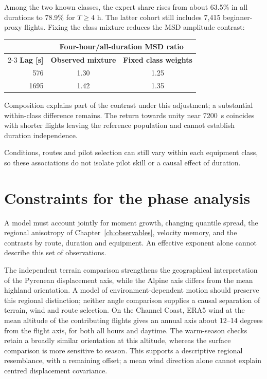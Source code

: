 Among the two known classes, the expert share rises from about 63.5\% in all
durations to 78.9\% for $T\ge4$ h. The latter cohort still includes 7,415
beginner-proxy flights. Fixing the class mixture reduces the MSD amplitude contrast:
\begin{center}
\begin{tabular}{@{}rcc@{}}
\toprule
 & \multicolumn{2}{c}{\textbf{Four-hour/all-duration MSD ratio}} \\
\cmidrule(l){2-3}
\textbf{Lag [s]} & \textbf{Observed mixture} & \textbf{Fixed class weights} \\
\midrule
576 & 1.30 & 1.25 \\
1695 & 1.42 & 1.35 \\
\bottomrule
\end{tabular}
\end{center}
Composition explains part of the contrast under this adjustment; a substantial
within-class difference remains. The return towards unity near
\SI{7200}{\second} coincides with shorter flights leaving the reference population
and cannot establish duration independence.

Conditions, routes and pilot selection can still vary within each equipment class,
so these associations do not isolate pilot skill or a causal effect of duration.

\FloatBarrier
\section{Constraints for the phase analysis}
\label{sec:transport-verdict}

A model must account jointly for moment growth, changing quantile spread, the
regional anisotropy of Chapter~\ref{ch:observables}, velocity memory, and the contrasts
by route, duration and equipment. An effective exponent alone cannot describe this set of observations.

The independent terrain comparison strengthens the geographical interpretation
of the Pyrenean displacement axis, while the Alpine axis differs from the mean
highland orientation. A model of environment-dependent motion should preserve
this regional distinction; neither angle comparison supplies a causal separation
of terrain, wind and route selection. On the Channel Coast, ERA5 wind at the
mean altitude of the contributing flights gives an annual axis about 12--14
degrees from the flight axis, for both all hours and daytime. The warm-season
checks retain a broadly similar orientation at this altitude, whereas the
surface comparison is more sensitive to season. This supports a descriptive
regional resemblance, with a remaining offset; a mean wind direction alone
cannot explain centred displacement covariance.

